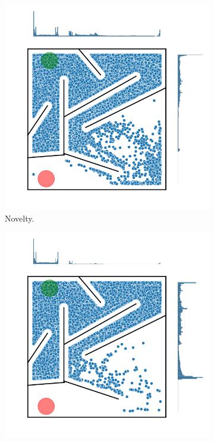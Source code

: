 \begin{figure}[H]
\begin{mdframed}
\begin{subfigure}[b]{0.5\textwidth}
            \includegraphics[scale=0.4]{resources/mazes/pure_novelty_hard_all.png}
            \caption{Novelty.}
        \end{subfigure}
        \begin{subfigure}[b]{0.5\textwidth}
            \includegraphics[scale=0.4]{resources/mazes/fitness_novelty_hard_all.png}

\end{subfigure}
\end{mdframed}
\end{figure}
